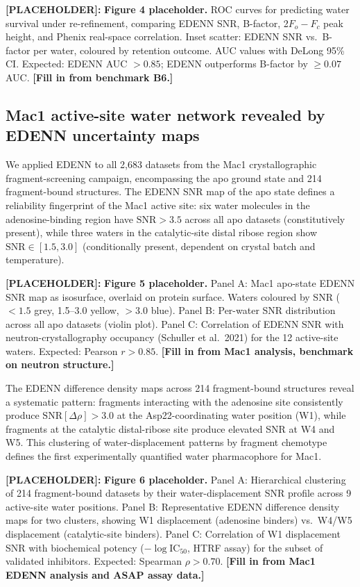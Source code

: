 \documentclass[10pt,twocolumn]{article}
\newcommand{\placeholder}[1]{%
  \begin{mdframed}[
    linecolor=placeholder,linewidth=1pt,
    backgroundcolor=red!5,
    innertopmargin=6pt,innerbottommargin=6pt,
    innerleftmargin=8pt,innerrightmargin=8pt]
  \small\color{placeholder}\textbf{[PLACEHOLDER]:} #1
  \end{mdframed}
}
\newcommand{\rhodiff}{\Delta\rho}
\newcommand{\SNR}{\mathrm{SNR}}
\begin{document}
\placeholder{
\textbf{Figure 4 placeholder.}
ROC curves for predicting water survival under re-refinement,
comparing EDENN SNR, B-factor, 2$F_o-F_c$ peak height, and
Phenix real-space correlation.
Inset scatter: EDENN SNR vs.\ B-factor per water, coloured by
retention outcome.
AUC values with DeLong 95\% CI.
Expected: EDENN AUC $> 0.85$; EDENN outperforms B-factor by
$\geq 0.07$ AUC.
\textbf{[Fill in from benchmark B6.]}
}

\subsection{Mac1 active-site water network revealed by EDENN
uncertainty maps}

We applied EDENN to all 2,683 datasets from the Mac1
crystallographic fragment-screening campaign, encompassing
the apo ground state and 214 fragment-bound structures.
The EDENN SNR map of the apo state defines a reliability
fingerprint of the Mac1 active site: six water molecules in
the adenosine-binding region have $\SNR > 3.5$ across all
apo datasets (constitutively present), while three waters in
the catalytic-site distal ribose region show
$\SNR \in [1.5, 3.0]$ (conditionally present, dependent on
crystal batch and temperature).

\placeholder{
\textbf{Figure 5 placeholder.}
Panel A: Mac1 apo-state EDENN SNR map as isosurface, overlaid
on protein surface.  Waters coloured by SNR ($<1.5$ grey,
1.5--3.0 yellow, $>3.0$ blue).
Panel B: Per-water SNR distribution across all apo datasets
(violin plot).
Panel C: Correlation of EDENN SNR with neutron-crystallography
occupancy (Schuller et al.\ 2021) for the 12 active-site waters.
Expected: Pearson $r > 0.85$.
\textbf{[Fill in from Mac1 analysis, benchmark on neutron structure.]}
}

The EDENN difference density maps across 214 fragment-bound
structures reveal a systematic pattern: fragments interacting
with the adenosine site consistently produce
$\SNR[\rhodiff] > 3.0$ at the Asp22-coordinating water position
(W1), while fragments at the catalytic distal-ribose site produce
elevated SNR at W4 and W5.
This clustering of water-displacement patterns by fragment
chemotype defines the first experimentally quantified water
pharmacophore for Mac1.

\placeholder{
\textbf{Figure 6 placeholder.}
Panel A: Hierarchical clustering of 214 fragment-bound datasets
by their water-displacement SNR profile across 9 active-site
water positions.
Panel B: Representative EDENN difference density maps for two
clusters, showing W1 displacement (adenosine binders) vs.\
W4/W5 displacement (catalytic-site binders).
Panel C: Correlation of W1 displacement SNR with biochemical
potency ($-\log\mathrm{IC}_{50}$, HTRF assay) for the subset of
validated inhibitors.
Expected: Spearman $\rho > 0.70$.
\textbf{[Fill in from Mac1 EDENN analysis and ASAP assay data.]}
}
\end{document}
